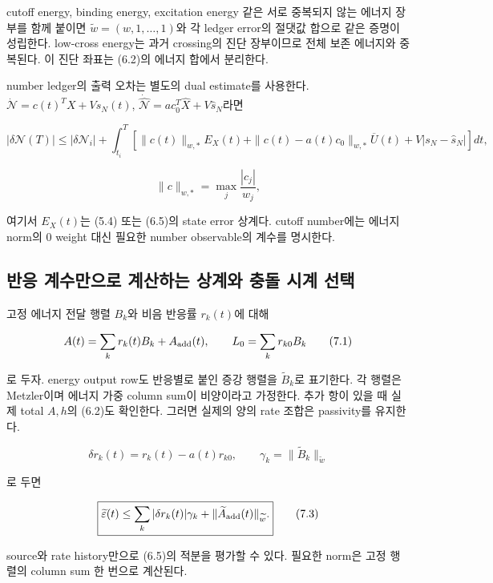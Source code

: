 cutoff energy, binding energy, excitation energy 같은 서로 중복되지 않는 에너지 장부를 함께 붙이면 \(\widetilde w=(w,1,\ldots,1)\)와 각 ledger error의 절댓값 합으로 같은 증명이 성립한다. low-cross energy는 과거 crossing의 진단 장부이므로 전체 보존 에너지와 중복된다. 이 진단 좌표는 (6.2)의 에너지 합에서 분리한다.

number ledger의 출력 오차는 별도의 dual estimate를 사용한다. \(\dot{\mathcal N}=c(t)^TX+V s_N(t)\), \(\dot{\widehat{\mathcal N}}=a c_0^T\widehat X+V\widehat s_N\)라면

\[
|\delta\mathcal N(T)|
\le|\delta\mathcal N_i|+
\int_{t_i}^{T}
\left[
\|c(t)\|_{w,*}E_X(t)
+\|c(t)-a(t)c_0\|_{w,*}\overline U(t)
+V|s_N-\widehat s_N|
\right]dt,
\tag{6.6}
\]

\[
\|c\|_{w,*}=\max_j\frac{|c_j|}{w_j},
\tag{6.7}
\]

여기서 \(E_X(t)\)는 (5.4) 또는 (6.5)의 state error 상계다. cutoff number에는 에너지 norm의 0 weight 대신 필요한 number observable의 계수를 명시한다.

\hypertarget{uxbc18uxc751-uxacc4uxc218uxb9ccuxc73cuxb85c-uxacc4uxc0b0uxd558uxb294-uxc0c1uxacc4uxc640-uxcda9uxb3cc-uxc2dcuxacc4-uxc120uxd0dd}{%
\subsection{반응 계수만으로 계산하는 상계와 충돌 시계 선택}\label{uxbc18uxc751-uxacc4uxc218uxb9ccuxc73cuxb85c-uxacc4uxc0b0uxd558uxb294-uxc0c1uxacc4uxc640-uxcda9uxb3cc-uxc2dcuxacc4-uxc120uxd0dd}}

고정 에너지 전달 행렬 \(B_k\)와 비음 반응률 \(r_k(t)\)에 대해

\[
A(t)=\sum_k r_k(t)B_k+A_{\rm add}(t),\qquad
L_0=\sum_k r_{k0}B_k
\tag{7.1}
\]

로 두자. energy output row도 반응별로 붙인 증강 행렬을 \(\widetilde B_k\)로 표기한다. 각 행렬은 Metzler이며 에너지 가중 column sum이 비양이라고 가정한다. 추가 항이 있을 때 실제 total \(A,h\)의 (6.2)도 확인한다. 그러면 실제의 양의 rate 조합은 passivity를 유지한다.

\[
\delta r_k(t)=r_k(t)-a(t)r_{k0},\qquad
\gamma_k=\|\widetilde B_k\|_{\widetilde w}
\tag{7.2}
\]

로 두면

\[
\boxed{
\widetilde\varepsilon(t)
\le\sum_k|\delta r_k(t)|\gamma_k
+\|\widetilde A_{\rm add}(t)\|_{\widetilde w}.
}
\tag{7.3}
\]

source와 rate history만으로 (6.5)의 적분을 평가할 수 있다. 필요한 norm은 고정 행렬의 column sum 한 번으로 계산된다.

